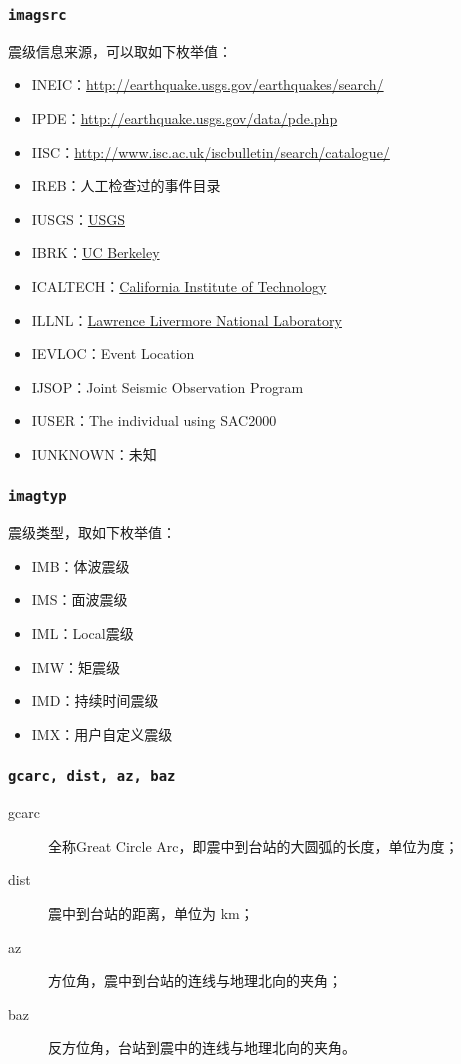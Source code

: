 \subsubsection{\texttt{imagsrc}}
震级信息来源，可以取如下枚举值：
\begin{itemize}
\ttfamily
\item INEIC：\url{http://earthquake.usgs.gov/earthquakes/search/}
\item IPDE：\url{http://earthquake.usgs.gov/data/pde.php}
\item IISC：\url{http://www.isc.ac.uk/iscbulletin/search/catalogue/}
\item IREB：人工检查过的事件目录
\item IUSGS：\href{http://earthquake.usgs.gov}{USGS}
\item IBRK：\href{http://seismo.berkeley.edu/}{UC Berkeley}
\item ICALTECH：\href{http://www.seismolab.caltech.edu}{California Institute of Technology}
\item ILLNL：\href{https://www.llnl.gov/}{Lawrence Livermore National Laboratory}
\item IEVLOC：Event Location
\item IJSOP：Joint Seismic Observation Program
\item IUSER：The individual using SAC2000
\item IUNKNOWN：未知
\end{itemize}

\subsubsection{\texttt{imagtyp}}
震级类型，取如下枚举值：
\begin{itemize}
\ttfamily
\item IMB：体波震级
\item IMS：面波震级
\item IML：Local震级
\item IMW：矩震级
\item IMD：持续时间震级
\item IMX：用户自定义震级
\end{itemize}

\subsubsection{\texttt{gcarc, dist, az, baz}}
\begin{description}
\item [gcarc] 全称Great Circle Arc，即震中到台站的大圆弧的长度，单位为度；
\item [dist] 震中到台站的距离，单位为 \si{\km}；
\item [az] 方位角，震中到台站的连线与地理北向的夹角；
\item [baz] 反方位角，台站到震中的连线与地理北向的夹角。
\end{description}

